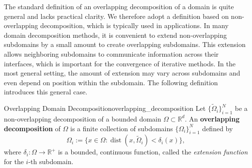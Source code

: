 \vspace{8pt}
\noindent The standard definition of an overlapping decomposition of a domain is quite general and lacks practical clarity. We therefore adopt a definition based on non-overlapping decomposition, which is typically used in applications. In many domain decomposition methods, it is convenient to extend non-overlapping subdomains by a small amount to create overlapping subdomains.  
This extension allows neighboring subdomains to communicate information across their interfaces, which is important for the convergence of iterative methods.  
In the most general setting, the amount of extension may vary across subdomains and even depend on position within the subdomain. The following definition introduces this general case.

\begin{definition}{Overlapping Domain Decomposition}{overlapping_decomposition}
Let $\{\widetilde{\Omega}_i\}_{i=1}^N$ be a non-overlapping decomposition of a bounded domain $\Omega\subset \mathbb{R}^{d}$. An \textbf{overlapping decomposition} of $\Omega$ is a finite collection of subdomains $\{\Omega_i\}_{i=1}^N$ defined by
\begin{equation*}
    \Omega_i := \{ x \in \Omega : \operatorname{dist}(x, \widetilde{\Omega}_i) < \delta_i(x) \},
\end{equation*}
where $\delta_i: \Omega \to \mathbb{R}^{+}$ is a bounded, continuous function, called the \textit{extension function} for the $i$-th subdomain.
\end{definition}

